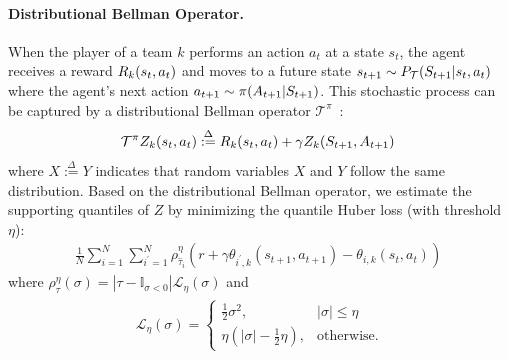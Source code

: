 \documentclass[letterpaper]{article} %
\newcommand{\state}{s}
\newcommand{\action}{a}
\newcommand{\transition}{t}
\newcommand{\reward}{r}
\newcommand{\agentIndex}{k}
\newcommand{\quantielIndex}{i}
\newcommand{\expect}{\mathbb{E}}
\begin{document}
\paragraph{Distributional Bellman Operator.}
When the player of a team $\agentIndex$ performs an action $\action_t$
at a state $\state_t$, the agent receives a reward $\MakeUppercase{\reward}_{\agentIndex}(\state_t,\action_t)$ and moves to a future state $\state_{t+1}\sim P_{\mathcal{\MakeUppercase{\transition}}}(\MakeUppercase{\state}_{t+1}|\state_t,\action_t)$ where the agent's next action $\action_{t+1}\sim\pi(\MakeUppercase{\action}_{t+1}|\MakeUppercase{\state}_{t+1})$. This stochastic process can be captured by a distributional Bellman operator $\mathcal{T}^{\pi}$~\cite{bellemare2017distributional}:
\begin{equation}
    \mathcal{T}^{\pi}{Z}_{\agentIndex}(\state_t,\action_t) \overset{\Delta}{:=} \MakeUppercase{\reward}_{\agentIndex}(\state_t,\action_t) + \gamma {Z}_{\agentIndex}(\MakeUppercase{\state}_{t+1},\MakeUppercase{\action}_{t+1})~\label{eqn:bellman-operator}
\end{equation}
where $X\overset{\Delta}{:=}Y$ indicates that random variables $X$ and $Y$ follow the same distribution.
Based on the distributional Bellman operator, we estimate the supporting quantiles of $Z$ by minimizing the quantile Huber loss (with threshold $\eta$):
\begin{align}
    \frac{1}{N}\sum_{\quantielIndex=1}^N\sum_{\quantielIndex^{\prime}=1}^N\rho^{\eta}_{\hat{\tau}_\quantielIndex}(\reward+\gamma\theta_{\quantielIndex^{\prime},\agentIndex}(\state_{t+1},\action_{t+1})-\theta_{\quantielIndex,\agentIndex}(\state_{t},\action_{t})) \nonumber~\label{eq:huber}
\end{align}
where $\rho_{\tau}^{\eta}(\sigma) = |\tau - \mathbb{I}_{\sigma<0}|\mathcal{L}_{\eta}(\sigma)$ and
\begin{align}
\begin{split}
    \mathcal{L}_{\eta}(\sigma) = \begin{cases}
    \tfrac12 \sigma^2, & |\sigma| \leq \eta\\
    \eta(|\sigma|-\frac12 \eta), & \mathrm{otherwise}.
\end{cases}
\end{split}
\end{align}
\end{document}
